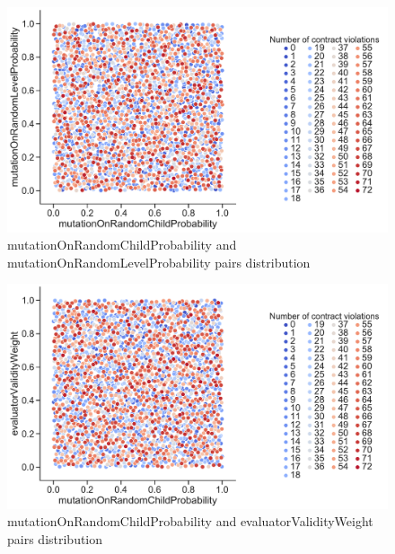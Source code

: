\begin{figure}
	\centering
	\includegraphics[width=\textwidth]{images/PairsDistr/mutationOnRandomChildProbability_mutationOnRandomLevelProbability.pdf}
	\caption[mutationOnRandomChildProbability and mutationOnRandomLevelProbability pairs distribution]{mutationOnRandomChildProbability and mutationOnRandomLevelProbability pairs distribution} 
	\label{fig:mutationOnRandomChildProbability_mutationOnRandomLevelProbability_pair}
\end{figure}
\clearpage
\begin{figure}
	\centering
	\includegraphics[width=\textwidth]{images/PairsDistr/mutationOnRandomChildProbability_evaluatorValidityWeight.pdf}
	\caption[mutationOnRandomChildProbability and evaluatorValidityWeight pairs distribution]{mutationOnRandomChildProbability and evaluatorValidityWeight pairs distribution}
	\label{fig:mutationOnRandomChildProbability_evaluatorValidityWeight_pair}
\end{figure}
\clearpage
